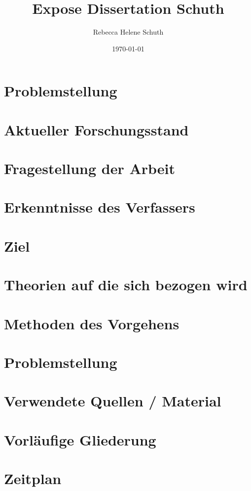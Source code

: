 \documentclass{expose} %
\title{Expose Dissertation Schuth}
\author{Rebecca Helene Schuth}
\date{\today}
\begin{document}
\maketitle


\section{Problemstellung}
\section{Aktueller Forschungsstand}
\section{Fragestellung der Arbeit}
\section{Erkenntnisse des Verfassers}
\section{Ziel}
\section{Theorien auf die sich bezogen wird}
\section{Methoden des Vorgehens}
\section{Problemstellung}
\section{Verwendete Quellen / Material}
\section{Vorläufige Gliederung}
\section{Zeitplan}


%
\end{document}
